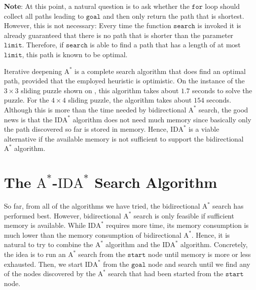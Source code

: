 \begin{enumerate}
      \textbf{Note}: At this point, a natural question is to ask whether the $\texttt{for}$ loop should collect
      all paths leading to $\texttt{goal}$ and then only return the path that is shortest.  However, this is
      not necessary:  Every time the function $\texttt{search}$ is invoked it is already guaranteed that there
      is no path that is shorter than the parameter $\texttt{limit}$.  Therefore, if $\texttt{search}$ is able
      to find a path that has a length of at most $\texttt{limit}$, this path is known to be optimal.
\end{enumerate}
Iterative deepening $\mathrm{A}^*$ is a complete search algorithm that does find an optimal path, provided that the employed heuristic
is optimistic.  On the instance of the $3 \times 3$ sliding puzzle shown on , this
algorithm takes about $1.7$ seconds to solve the puzzle.  For the $4 \times 4$ sliding puzzle, the algorithm
takes about $154$ seconds.  Although this is more than the time needed by bidirectional $\mathrm{A}^*$ search,
the good news is that the $\mathrm{IDA}^*$ algorithm does not need much memory since basically only the path
discovered so far is stored in memory.  Hence, $\mathrm{IDA}^*$ is a viable alternative if the available memory
is not sufficient to support the bidirectional $\mathrm{A}^*$ algorithm.

\section{The $\mathrm{A}^*$-$\mathrm{IDA}^*$ Search Algorithm}
So far, from all of the algorithms we have tried, the bidirectional $\mathrm{A}^*$ search has performed best.  However,
bidirectional $\mathrm{A}^*$ search is only feasible if sufficient memory is available.   While
$\mathrm{IDA}^*$ requires more time, its memory consumption is much lower than the memory consumption of
bidirectional $\mathrm{A}^*$.  Hence, it is natural to try to combine the $\mathrm{A}^*$ algorithm and the
$\mathrm{IDA}^*$ algorithm.  Concretely, the
idea is to run an $\mathrm{A}^*$ search from the $\texttt{start}$ node until memory is more or less
exhausted.  Then, we start $\mathrm{IDA}^*$ from the $\texttt{goal}$ node and search until we find any of the
nodes discovered by the $\mathrm{A}^*$ search that had been started from the $\texttt{start}$ node.

